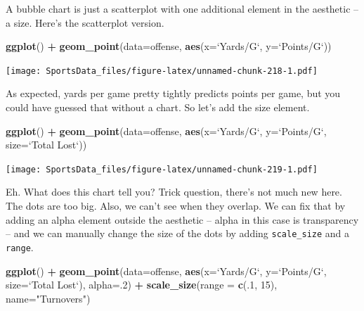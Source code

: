 \documentclass[
]{book}
\newenvironment{Shaded}{\begin{snugshade}}{\end{snugshade}}
\newcommand{\DataTypeTok}[1]{\textcolor[rgb]{0.13,0.29,0.53}{#1}}
\newcommand{\DecValTok}[1]{\textcolor[rgb]{0.00,0.00,0.81}{#1}}
\newcommand{\KeywordTok}[1]{\textcolor[rgb]{0.13,0.29,0.53}{\textbf{#1}}}
\newcommand{\NormalTok}[1]{#1}
\newcommand{\OperatorTok}[1]{\textcolor[rgb]{0.81,0.36,0.00}{\textbf{#1}}}
\newcommand{\StringTok}[1]{\textcolor[rgb]{0.31,0.60,0.02}{#1}}
\begin{document}
A bubble chart is just a scatterplot with one additional element in the aesthetic -- a size. Here's the scatterplot version.

\begin{Shaded}
\begin{Highlighting}[]
\KeywordTok{ggplot}\NormalTok{() }\OperatorTok{+}\StringTok{ }\KeywordTok{geom_point}\NormalTok{(}\DataTypeTok{data=}\NormalTok{offense, }\KeywordTok{aes}\NormalTok{(}\DataTypeTok{x=}\StringTok{`}\DataTypeTok{Yards/G}\StringTok{`}\NormalTok{, }\DataTypeTok{y=}\StringTok{`}\DataTypeTok{Points/G}\StringTok{`}\NormalTok{))}
\end{Highlighting}
\end{Shaded}

\texttt{[image: SportsData\_files/figure-latex/unnamed-chunk-218-1.pdf]}

As expected, yards per game pretty tightly predicts points per game, but you could have guessed that without a chart. So let's add the size element.

\begin{Shaded}
\begin{Highlighting}[]
\KeywordTok{ggplot}\NormalTok{() }\OperatorTok{+}\StringTok{ }\KeywordTok{geom_point}\NormalTok{(}\DataTypeTok{data=}\NormalTok{offense, }\KeywordTok{aes}\NormalTok{(}\DataTypeTok{x=}\StringTok{`}\DataTypeTok{Yards/G}\StringTok{`}\NormalTok{, }\DataTypeTok{y=}\StringTok{`}\DataTypeTok{Points/G}\StringTok{`}\NormalTok{, }\DataTypeTok{size=}\StringTok{`}\DataTypeTok{Total Lost}\StringTok{`}\NormalTok{)) }
\end{Highlighting}
\end{Shaded}

\texttt{[image: SportsData\_files/figure-latex/unnamed-chunk-219-1.pdf]}

Eh. What does this chart tell you? Trick question, there's not much new here. The dots are too big. Also, we can't see when they overlap. We can fix that by adding an alpha element outside the aesthetic -- alpha in this case is transparency -- and we can manually change the size of the dots by adding \texttt{scale\_size} and a \texttt{range}.

\begin{Shaded}
\begin{Highlighting}[]
\KeywordTok{ggplot}\NormalTok{() }\OperatorTok{+}\StringTok{ }\KeywordTok{geom_point}\NormalTok{(}\DataTypeTok{data=}\NormalTok{offense, }\KeywordTok{aes}\NormalTok{(}\DataTypeTok{x=}\StringTok{`}\DataTypeTok{Yards/G}\StringTok{`}\NormalTok{, }\DataTypeTok{y=}\StringTok{`}\DataTypeTok{Points/G}\StringTok{`}\NormalTok{, }\DataTypeTok{size=}\StringTok{`}\DataTypeTok{Total Lost}\StringTok{`}\NormalTok{), }\DataTypeTok{alpha=}\NormalTok{.}\DecValTok{2}\NormalTok{) }\OperatorTok{+}\StringTok{ }\KeywordTok{scale_size}\NormalTok{(}\DataTypeTok{range =} \KeywordTok{c}\NormalTok{(.}\DecValTok{1}\NormalTok{, }\DecValTok{15}\NormalTok{), }\DataTypeTok{name=}\StringTok{"Turnovers"}\NormalTok{)}
\end{Highlighting}
\end{Shaded}
\end{document}
